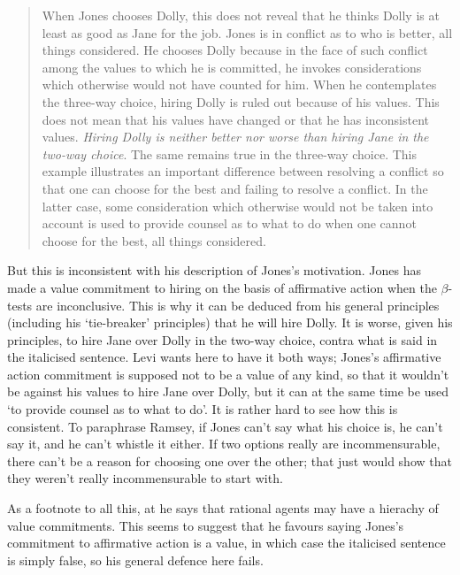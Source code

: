 \begin{quote}
When Jones chooses Dolly, this does not reveal that he thinks Dolly is
at least as good as Jane for the job. Jones is in conflict as to who is
better, all things considered. He chooses Dolly because in the face of
such conflict among the values to which he is committed, he invokes
considerations which otherwise would not have counted for him. When he
contemplates the three-way choice, hiring Dolly is ruled out because of
his values. This does not mean that his values have changed or that he
has inconsistent values. \emph{Hiring Dolly is neither better nor worse
than hiring Jane in the two-way choice}. The same remains true in the
three-way choice. This example illustrates an important difference
between resolving a conflict so that one can choose for the best and
failing to resolve a conflict. In the latter case, some consideration
which otherwise would not be taken into account is used to provide
counsel as to what to do when one cannot choose for the best, all things
considered. \citet[34, my italics]{Levi1986}
\end{quote}

But this is inconsistent with his description of Jones's motivation.
Jones has made a value commitment to hiring on the basis of affirmative
action when the $\beta$-tests are inconclusive. This is why it can be deduced
from his general principles (including his `tie-breaker' principles)
that he will hire Dolly. It is worse, given his principles, to hire Jane
over Dolly in the two-way choice, contra what is said in the italicised
sentence. Levi wants here to have it both ways; Jones's affirmative
action commitment is supposed not to be a value of any kind, so that it
wouldn't be against his values to hire Jane over Dolly, but it can at
the same time be used `to provide counsel as to what to do'. It is
rather hard to see how this is consistent. To paraphrase Ramsey, if
Jones can't say what his choice is, he can't say it, and he can't
whistle it either. If two options really are incommensurable, there
can't be a reason for choosing one over the other; that just would show
that they weren't really incommensurable to start with.

As a footnote to all this, at \citeyearpar[82]{Levi1986} he says that rational agents
may have a hierachy of value commitments. This seems to suggest that he
favours saying Jones's commitment to affirmative action is a value, in
which case the italicised sentence is simply false, so his general
defence here fails.


